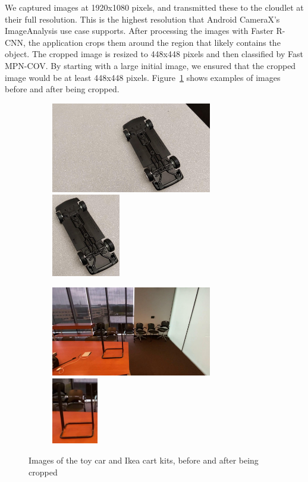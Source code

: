 We captured images at 1920x1080 pixels, and transmitted these to the cloudlet at
their full resolution.
This is the highest resolution that Android CameraX's ImageAnalysis use case
supports.
After processing the images with Faster R-CNN, the application crops them around
the region that likely contains the object.
The cropped image is resized to 448x448 pixels and then classified by Fast
MPN-COV.
By starting with a large initial image, we ensured that the cropped image would
be at least 448x448 pixels.
Figure~\ref{fig:crop_examples} shows examples of images before and after being
cropped.

\begin{figure}
  \begin{subfigure}{\textwidth}
    \includegraphics[width=7cm]{figures/two_stage/car_original.jpg}
    \includegraphics[width=3cm]{figures/two_stage/car_crop.jpg}
  \end{subfigure}
  \begin{subfigure}{\textwidth}
    \includegraphics[width=7cm]{figures/two_stage/cart_original.jpg}
    \includegraphics[width=2cm]{figures/two_stage/cart_crop.jpg}
  \end{subfigure}
  \caption{
    Images of the toy car and Ikea cart kits, before and after being cropped
  }\label{fig:crop_examples}
\end{figure}

